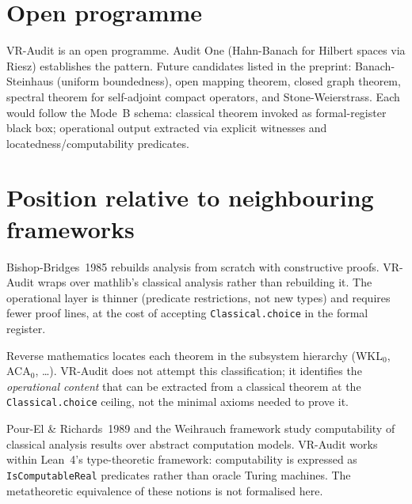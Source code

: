 \section{Open programme}
\label{sec:audit_open}

\begin{remark}
\label{rem:open_programme}
VR-Audit is an open programme.  Audit One (Hahn-Banach for Hilbert spaces
via Riesz) establishes the pattern.  Future candidates listed in the
preprint: Banach-Steinhaus (uniform boundedness), open mapping theorem,
closed graph theorem, spectral theorem for self-adjoint compact operators,
and Stone-Weierstrass.  Each would follow the Mode~B schema: classical
theorem invoked as formal-register black box; operational output extracted
via explicit witnesses and locatedness/computability predicates.
\end{remark}

\section{Position relative to neighbouring frameworks}
\label{sec:audit_comparison}

\begin{remark}
\label{rem:compare_bishop}
Bishop-Bridges~1985 rebuilds analysis from scratch with constructive proofs.
VR-Audit wraps over mathlib's classical analysis rather than rebuilding it.
The operational layer is thinner (predicate restrictions, not new types)
and requires fewer proof lines, at the cost of accepting
\texttt{Classical.choice} in the formal register.
\end{remark}

\begin{remark}
\label{rem:compare_reverse_math}
Reverse mathematics locates each theorem in the subsystem hierarchy
(WKL$_0$, ACA$_0$, \ldots).  VR-Audit does not attempt this classification;
it identifies the \emph{operational content} that can be extracted from a
classical theorem at the \texttt{Classical.choice} ceiling, not the minimal
axioms needed to prove it.
\end{remark}

\begin{remark}
\label{rem:compare_weihrauch}
Pour-El \& Richards~1989 and the Weihrauch framework study computability of
classical analysis results over abstract computation models.  VR-Audit works
within Lean~4's type-theoretic framework: computability is expressed as
\texttt{IsComputableReal} predicates rather than oracle Turing machines.
The metatheoretic equivalence of these notions is not formalised here.
\end{remark}


